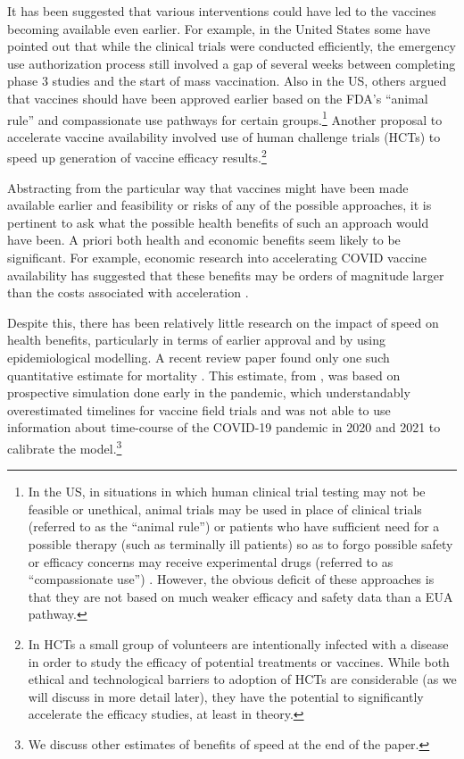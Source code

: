 \documentclass{article}
\begin{document}
It has been suggested that various interventions could have led to the vaccines becoming available even earlier. For example, in the United States some have pointed out that while the clinical trials were conducted efficiently, the emergency use authorization process still involved a gap of several weeks between completing phase 3 studies and the start of mass vaccination. Also in the US, others argued that vaccines should have been approved earlier based on the FDA's ``animal rule'' and compassionate use pathways for certain groups.\footnote{In the US, in situations in which human clinical trial testing may not be feasible or unethical, animal trials may be used in place of clinical trials (referred to as the ``animal rule'') or patients who have sufficient need for a possible therapy (such as terminally ill patients) so as to forgo possible safety or efficacy concerns may receive experimental drugs (referred to as ``compassionate use'') \citep[@Rizk2021Expanded]{Commissioner2023Animal}. However, the obvious deficit of these approaches is that they are not based on much weaker efficacy and safety data than a EUA pathway.} Another proposal to accelerate vaccine availability involved use of human challenge trials (HCTs) to speed up generation of vaccine efficacy results.\footnote{In HCTs a small group of volunteers are intentionally infected with a disease in order to study the efficacy of potential treatments or vaccines. While both ethical and technological barriers to adoption of HCTs are considerable (as we will discuss in more detail later), they have the potential to significantly accelerate the efficacy studies, at least in theory.}

Abstracting from the particular way that vaccines might have been made available earlier and feasibility or risks of any of the possible approaches, it is pertinent to ask what the possible health benefits of such an approach would have been. A priori both health and economic benefits seem likely to be significant. For example, economic research into accelerating COVID vaccine availability has suggested that these benefits may be orders of magnitude larger than the costs associated with acceleration \citep{Castillo2021Market}.

Despite this, there has been relatively little research on the impact of speed on health benefits, particularly in terms of earlier approval and by using epidemiological modelling. A recent review paper found only one such quantitative estimate for mortality \citep{Wiecek2022Clinical}. This estimate, from \citet{Berry2020ACost}, was based on prospective simulation done early in the pandemic, which understandably overestimated timelines for vaccine field trials and was not able to use information about time-course of the COVID-19 pandemic in 2020 and 2021 to calibrate the model.\footnote{We discuss other estimates of benefits of speed at the end of the paper.}
\end{document}
